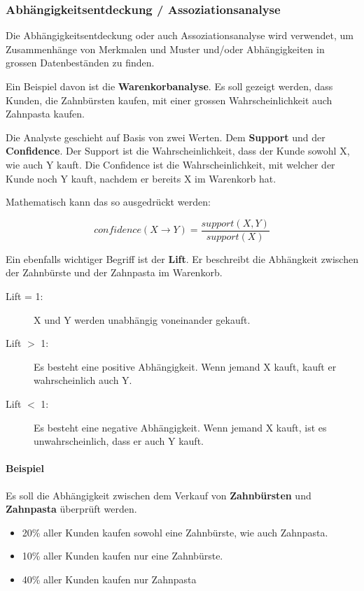 \documentclass[a4paper, 11pt]{article}
\begin{document}
\newpage

\subsubsection{Abhängigkeitsentdeckung / Assoziationsanalyse}
Die Abhängigkeitsentdeckung oder auch Assoziationsanalyse wird verwendet, um Zusammenhänge von Merkmalen und Muster und/oder Abhängigkeiten in grossen Datenbeständen zu finden. 

Ein Beispiel davon ist die \textbf{Warenkorbanalyse}. Es soll gezeigt werden, dass Kunden, die Zahnbürsten kaufen, mit einer grossen Wahrscheinlichkeit auch Zahnpasta kaufen.
\vspace{10px}

\noindent Die Analyste geschieht auf Basis von zwei Werten. Dem \textbf{Support} und der \textbf{Confidence}. Der Support ist die Wahrscheinlichkeit, dass der Kunde sowohl X, wie auch Y kauft. Die Confidence ist die Wahrscheinlichkeit, mit welcher der Kunde noch Y kauft, nachdem er bereits X im Warenkorb hat.
\vspace{10px}

\noindent Mathematisch kann das so ausgedrückt werden:

\begin{equation}
confidence({X} \rightarrow {Y}) = \dfrac{support({X, Y})}{support({X})}
\end{equation}

Ein ebenfalls wichtiger Begriff ist der \textbf{Lift}. Er beschreibt die Abhängkeit zwischen der Zahnbürste und der Zahnpasta im Warenkorb.

\begin{description}
	\item[Lift = 1: ] X und Y werden unabhängig voneinander gekauft.
	\item[Lift $>$ 1: ] Es besteht eine positive Abhängigkeit. Wenn jemand X kauft, kauft er wahrscheinlich auch Y.
	\item[Lift $<$ 1: ] Es besteht eine negative Abhängigkeit. Wenn jemand X kauft, ist es unwahrscheinlich, dass er auch Y kauft.
\end{description}

\paragraph{Beispiel}
Es soll die Abhängigkeit zwischen dem Verkauf von \textbf{Zahnbürsten} und \textbf{Zahnpasta} überprüft werden.

\begin{itemize}
	\item 20\% aller Kunden kaufen sowohl eine Zahnbürste, wie auch Zahnpasta.
	\item 10\% aller Kunden kaufen nur eine Zahnbürste.
	\item 40\% aller Kunden kaufen nur Zahnpasta
\end{itemize}
\end{document}
